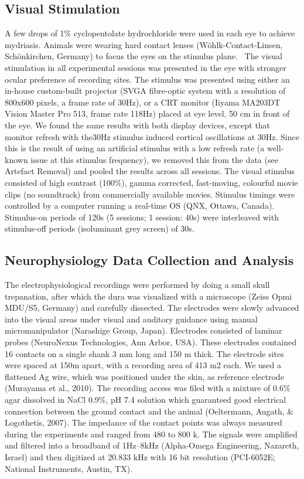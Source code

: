 \subsection{Visual Stimulation}
A few drops of 1\% cyclopentolate hydrochloride were used in each eye to achieve mydriasis. Animals were wearing hard contact lenses (W\"ohlk-Contact-Linsen, Sch\"onkirchen, Germany) to focus the eyes on the stimulus plane. \ The visual stimulation in all experimental sessions was presented in the eye with stronger ocular preference of recording sites. The stimulus was presented using either an in-house custom-built projector (SVGA fibre-optic system with a resolution of 800x600 pixels, a frame rate of 30Hz), or a CRT monitor (Iiyama MA203DT Vision Master Pro 513, frame rate 118Hz) placed at eye level, 50 cm in front of the eye. We found the same results with both display devices, except that monitor refresh with the30Hz stimulus induced cortical oscillations at 30Hz. Since this is the result of using an artificial stimulus with a low refresh rate (a well-known issue at this stimulus frequency), we removed this from the data (see Artefact Removal) and pooled the results across all sessions. The visual stimulus consisted of high contrast (100\%), gamma corrected, fast-moving, colourful movie clips (no soundtrack) from commercially available movies. Stimulus timings were controlled by a computer running a real-time OS (QNX, Ottawa, Canada). Stimulus-on periods of 120s (5 sessions; 1 session: 40s) were interleaved with stimulus-off periods (isoluminant grey screen) of 30s. 

\subsection{Neurophysiology Data Collection and Analysis}
The electrophysiological recordings were performed by doing a small skull trepanation, after which the dura was visualized with a microscope (Zeiss Opmi MDU/S5, Germany) and carefully dissected. The electrodes were slowly advanced into the visual areas under visual and auditory guidance using manual micromanipulator (Narashige Group, Japan). Electrodes consisted of laminar probes (NeuroNexus Technologies, Ann Arbor, USA). These electrodes contained 16 contacts on a single shank 3 mm long and 150 {\textmu}m thick. The electrode sites were spaced at 150{\textmu}m apart, with a recording area of 413 {\textmu}m2 each. We used a flattened \ac{Ag} wire, which was positioned under the skin, as reference electrode (Murayama et al., 2010). The recording access was filed with a mixture of 0.6\% agar dissolved in \ac{NaCl} 0.9\%, pH 7.4 solution which guaranteed good electrical connection between the ground contact and the animal (Oeltermann, Augath, \& Logothetis, 2007). The impedance of the contact points was always measured during the experiments and ranged from 480 to 800 k{\textohm}. The signals were amplified and filtered into a broadband of 1Hz--8kHz (Alpha-Omega Engineering, Nazareth, Israel) and then digitized at 20.833 kHz with 16 bit resolution (PCI-6052E; National Instruments, Austin, TX).

